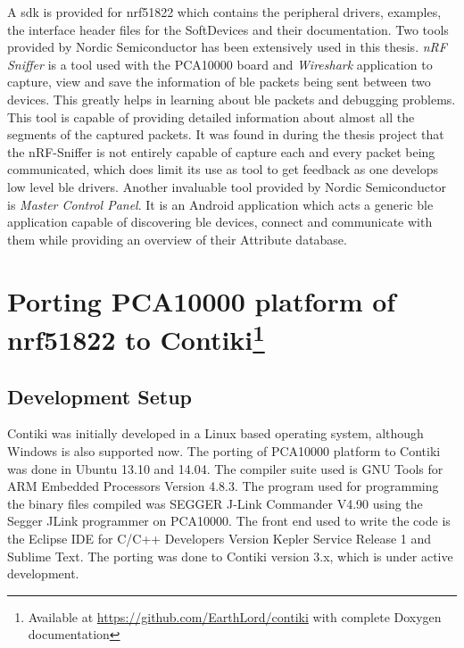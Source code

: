 A \gls{sdk} is provided for nrf51822 which contains the peripheral drivers, examples, the interface header files for the SoftDevices and their documentation. Two tools provided by Nordic Semiconductor has been extensively used in this thesis. \emph{nRF Sniffer} is a tool used with the PCA10000 board and \emph{Wireshark} application to capture, view and save the information of \gls{ble} packets being sent between two devices. This greatly helps in learning about \gls{ble} packets and debugging problems. This tool is capable of providing detailed information about almost all the segments of the captured packets. It was found in during the thesis project that the nRF-Sniffer is not entirely capable of capture each and every packet being communicated, which does limit its use as tool to get feedback as one develops low level \gls{ble} drivers. Another invaluable tool provided by Nordic Semiconductor is \emph{Master Control Panel}. It is an Android application which acts a generic \gls{ble} application capable of discovering \gls{ble} devices, connect and communicate with them while providing an overview of their Attribute database. 
%
%

\section[Porting PCA10000 platform of nrf51822 to Contiki]{Porting PCA10000 platform of nrf51822 to Contiki\footnote{Available at \url{https://github.com/EarthLord/contiki} with complete Doxygen documentation}} \label{5Porting}

\subsection{Development Setup}
Contiki was initially developed in a Linux based operating system, although Windows is also supported now. The porting of PCA10000 platform to Contiki was done in Ubuntu 13.10 and 14.04. The compiler suite used is GNU Tools for ARM Embedded Processors Version 4.8.3. The program used for programming the binary files compiled was SEGGER J-Link Commander V4.90 using the Segger JLink programmer on PCA10000. The front end used to write the code is the Eclipse IDE for C/C++ Developers Version Kepler Service Release 1 and Sublime Text. The porting was done to Contiki version 3.x, which is under active development.

